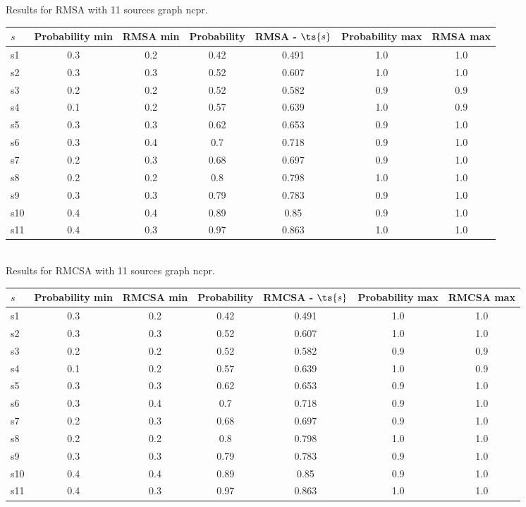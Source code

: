 \documentclass{article}
\begin{document}
\noindent Results for RMSA with 11 sources graph ncpr.

\noindent\begin{tabular}{|l|c|c|c|c|c|c|}
\hline
$s$& Probability min & RMSA min & Probability & RMSA - $\ts{s}$ & Probability max & RMSA max\\
\hline
s1 &0.3 & 0.2 & 0.42 & 0.491 & 1.0 & 1.0\\
\hline
s2 &0.3 & 0.3 & 0.52 & 0.607 & 1.0 & 1.0\\
\hline
s3 &0.2 & 0.2 & 0.52 & 0.582 & 0.9 & 0.9\\
\hline
s4 &0.1 & 0.2 & 0.57 & 0.639 & 1.0 & 0.9\\
\hline
s5 &0.3 & 0.3 & 0.62 & 0.653 & 0.9 & 1.0\\
\hline
s6 &0.3 & 0.4 & 0.7 & 0.718 & 0.9 & 1.0\\
\hline
s7 &0.2 & 0.3 & 0.68 & 0.697 & 0.9 & 1.0\\
\hline
s8 &0.2 & 0.2 & 0.8 & 0.798 & 1.0 & 1.0\\
\hline
s9 &0.3 & 0.3 & 0.79 & 0.783 & 0.9 & 1.0\\
\hline
s10 &0.4 & 0.4 & 0.89 & 0.85 & 0.9 & 1.0\\
\hline
s11 &0.4 & 0.3 & 0.97 & 0.863 & 1.0 & 1.0\\
\hline
\end{tabular}\\

\noindent Results for RMCSA with 11 sources graph ncpr.

\noindent\begin{tabular}{|l|c|c|c|c|c|c|}
\hline
$s$& Probability min & RMCSA min & Probability & RMCSA - $\ts{s}$ & Probability max & RMCSA max\\
\hline
s1 &0.3 & 0.2 & 0.42 & 0.491 & 1.0 & 1.0\\
\hline
s2 &0.3 & 0.3 & 0.52 & 0.607 & 1.0 & 1.0\\
\hline
s3 &0.2 & 0.2 & 0.52 & 0.582 & 0.9 & 0.9\\
\hline
s4 &0.1 & 0.2 & 0.57 & 0.639 & 1.0 & 0.9\\
\hline
s5 &0.3 & 0.3 & 0.62 & 0.653 & 0.9 & 1.0\\
\hline
s6 &0.3 & 0.4 & 0.7 & 0.718 & 0.9 & 1.0\\
\hline
s7 &0.2 & 0.3 & 0.68 & 0.697 & 0.9 & 1.0\\
\hline
s8 &0.2 & 0.2 & 0.8 & 0.798 & 1.0 & 1.0\\
\hline
s9 &0.3 & 0.3 & 0.79 & 0.783 & 0.9 & 1.0\\
\hline
s10 &0.4 & 0.4 & 0.89 & 0.85 & 0.9 & 1.0\\
\hline
s11 &0.4 & 0.3 & 0.97 & 0.863 & 1.0 & 1.0\\
\hline
\end{tabular}\\
\end{document}
